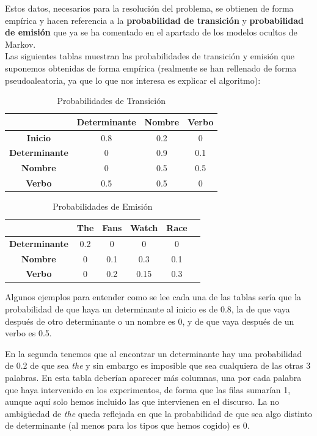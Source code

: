 \documentclass{article}
\begin{document}
Estos datos, necesarios para la resolución del problema, se obtienen de forma empírica y hacen referencia a la \textbf{probabilidad de transición} y \textbf{probabilidad de emisión} que ya se ha comentado en el apartado de los modelos ocultos de Markov. \\

Las siguientes tablas muestran las probabilidades de transición y emisión que suponemos obtenidas de forma empírica (realmente se han rellenado de forma pseudoaleatoria, ya que lo que nos interesa es explicar el algoritmo):

\begin{table}[h!]
\centering
\caption{Probabilidades de Transición}
\begin{tabular}{|c|c|c|c|}
\hline
 & \textbf{Determinante} & \textbf{Nombre} & \textbf{Verbo} \\ \hline
\textbf{Inicio} & 0.8 & 0.2 & 0 \\ \hline
\textbf{Determinante} & 0 & 0.9 & 0.1 \\ \hline
\textbf{Nombre} & 0 & 0.5 & 0.5 \\ \hline
\textbf{Verbo} & 0.5 & 0.5 & 0 \\ \hline
\end{tabular}
\end{table}

\begin{table}[h!]
\centering
\caption{Probabilidades de Emisión}
\begin{tabular}{|c|c|c|c|c|c|}
\hline
     & \textbf{The} & \textbf{Fans} & \textbf{Watch} & \textbf{Race} \\ \hline
    \textbf{Determinante} & 0.2 & 0 & 0 & 0 \\ \hline
    \textbf{Nombre} & 0 & 0.1 & 0.3 & 0.1 \\ \hline
    \textbf{Verbo} & 0 & 0.2 & 0.15 & 0.3 \\ \hline
\end{tabular}
\end{table}

Algunos ejemplos para entender como se lee cada una de las tablas sería que la probabilidad de que haya un determinante al inicio es de 0.8, la de que vaya después de otro determinante o un nombre es 0, y de que vaya después de un verbo es 0.5. 

En la segunda tenemos que al encontrar un determinante hay una probabilidad de 0.2 de que sea \textit{the} y sin embargo es imposible que sea cualquiera de las otras 3 palabras. En esta tabla deberían aparecer más columnas, una por cada palabra que haya intervenido en los experimentos, de forma que las filas sumarían 1, aunque aquí solo hemos incluido las que intervienen en el discurso. La no ambigüedad de \textit{the} queda reflejada en que la probabilidad de que sea algo distinto de determinante (al menos para los tipos que hemos cogido) es 0. 
\end{document}
